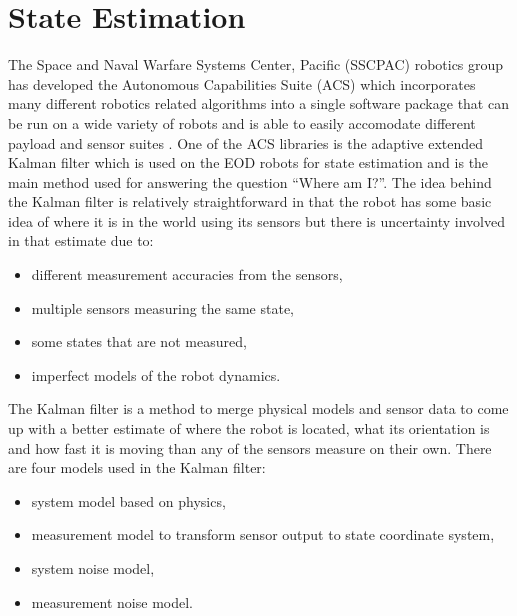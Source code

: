\chapter{State Estimation}
\label{ch:estimation}
The Space and Naval Warfare Systems Center, Pacific (SSCPAC) robotics group has developed the Autonomous Capabilities Suite (ACS) which incorporates many different robotics related algorithms into a single software package that can be run on a wide variety of robots and is able to easily accomodate different payload and sensor suites \cite{Sights06}. One of the ACS libraries is the adaptive extended Kalman filter which is used on the EOD robots for state estimation and is the main method used for answering the question ``Where am I?''. The idea behind the Kalman filter is relatively straightforward in that the robot has some basic idea of where it is in the world using its sensors but there is uncertainty involved in that estimate due to:
\begin{itemize}
\item different measurement accuracies from the sensors,
\item multiple sensors measuring the same state,
\item some states that are not measured,
\item imperfect models of the robot dynamics.
\end{itemize}

The Kalman filter is a method to merge physical models and sensor data to come up with a better estimate of where the robot is located, what its orientation is and how fast it is moving than any of the sensors measure on their own. There are four models used in the Kalman filter:
\begin{itemize}
\item system model based on physics,
\item measurement model to transform sensor output to state coordinate system,
\item system noise model,
\item measurement noise model.
\end{itemize}




